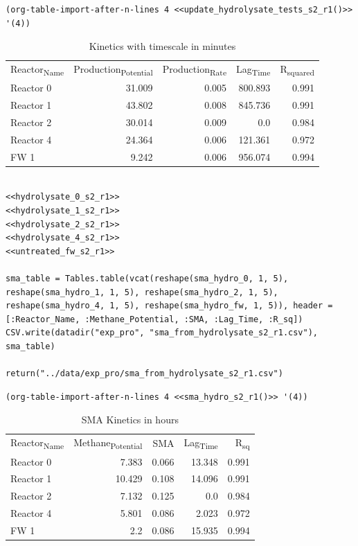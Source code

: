\documentclass[11pt]{article}
\begin{document}
\begin{verbatim}
(org-table-import-after-n-lines 4 <<update_hydrolysate_tests_s2_r1()>> '(4))
\end{verbatim}

\begin{table}[htbp]
\caption{Kinetics with timescale in minutes}
\centering
\begin{tabular}{lrrrr}
Reactor\textsubscript{Name} & Production\textsubscript{Potential} & Production\textsubscript{Rate} & Lag\textsubscript{Time} & R\textsubscript{squared}\\[0pt]
Reactor 0 & 31.009 & 0.005 & 800.893 & 0.991\\[0pt]
Reactor 1 & 43.802 & 0.008 & 845.736 & 0.991\\[0pt]
Reactor 2 & 30.014 & 0.009 & 0.0 & 0.984\\[0pt]
Reactor 4 & 24.364 & 0.006 & 121.361 & 0.972\\[0pt]
FW 1 & 9.242 & 0.006 & 956.074 & 0.994\\[0pt]
\end{tabular}
\end{table}

\begin{verbatim}

<<hydrolysate_0_s2_r1>>
<<hydrolysate_1_s2_r1>>
<<hydrolysate_2_s2_r1>>
<<hydrolysate_4_s2_r1>>
<<untreated_fw_s2_r1>>

sma_table = Tables.table(vcat(reshape(sma_hydro_0, 1, 5), reshape(sma_hydro_1, 1, 5), reshape(sma_hydro_2, 1, 5), reshape(sma_hydro_4, 1, 5), reshape(sma_hydro_fw, 1, 5)), header = [:Reactor_Name, :Methane_Potential, :SMA, :Lag_Time, :R_sq])
CSV.write(datadir("exp_pro", "sma_from_hydrolysate_s2_r1.csv"), sma_table)

return("../data/exp_pro/sma_from_hydrolysate_s2_r1.csv")
\end{verbatim}

\begin{verbatim}
(org-table-import-after-n-lines 4 <<sma_hydro_s2_r1()>> '(4))
\end{verbatim}

\begin{table}[htbp]
\caption{SMA Kinetics in hours}
\centering
\begin{tabular}{lrrrr}
Reactor\textsubscript{Name} & Methane\textsubscript{Potential} & SMA & Lag\textsubscript{Time} & R\textsubscript{sq}\\[0pt]
Reactor 0 & 7.383 & 0.066 & 13.348 & 0.991\\[0pt]
Reactor 1 & 10.429 & 0.108 & 14.096 & 0.991\\[0pt]
Reactor 2 & 7.132 & 0.125 & 0.0 & 0.984\\[0pt]
Reactor 4 & 5.801 & 0.086 & 2.023 & 0.972\\[0pt]
FW 1 & 2.2 & 0.086 & 15.935 & 0.994\\[0pt]
\end{tabular}
\end{table}
\end{document}
